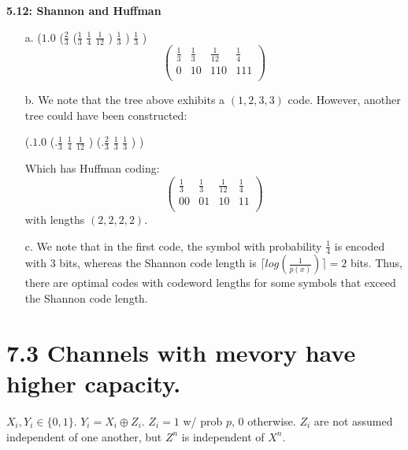 \documentclass[10pt]{article}
\begin{document}
\begin{tiny}
\begin{multicols}{3}
\textbf{5.12: Shannon and Huffman}
\begin{itemize}
	\item[a.]
($1.0$ ($\frac{2}{3}$ ($\frac{1}{3}$ $\frac{1}{4}$ $\frac{1}{12}$ ) $\frac{1}{3}$ ) $\frac{1}{3}$ )
\[
 \begin{pmatrix}
	\frac{1}{3} & \frac{1}{3} & \frac{1}{12} & \frac{1}{4}\\
	0           &  10         & 110          & 111\\
 \end{pmatrix}
\]
	\item[b.] We note that the tree above exhibits a $(1,2,3,3)$ code. However, another tree could have been constructed: 

(.$1.0$ (.$\frac{1}{3}$ $\frac{1}{4}$ $\frac{1}{12}$ ) (.$\frac{2}{3}$ $\frac{1}{3}$ $\frac{1}{3}$ ) ) 

Which has Huffman coding:
\[
 \begin{pmatrix}
	\frac{1}{3} & \frac{1}{3} & \frac{1}{12} & \frac{1}{4}\\
	00           &  01         & 10          & 11\\
 \end{pmatrix}
\] with lengths $(2, 2, 2, 2)$.
	\item[c.] We note that in the first code, the symbol with probability $\frac{1}{4}$ is encoded with $3$ bits, whereas the Shannon code length is $\lceil log(\frac{1}{p(x)}) \rceil = 2$ bits. Thus, there are optimal codes with codeword lengths for some symbols that exceed the Shannon code length.
\end{itemize}

\section*{7.3 Channels with mevory have higher capacity.}
    $X_i, Y_i \in \{0,1\}$.
    $Y_i = X_i \oplus Z_i$.
    $Z_i = 1$ w/ prob $p$, 0 otherwise.
    $Z_i$ are not assumed independent of one another, but $Z^n$ is independent of $X^n$.


\end{multicols}
\end{tiny}
\end{document}
